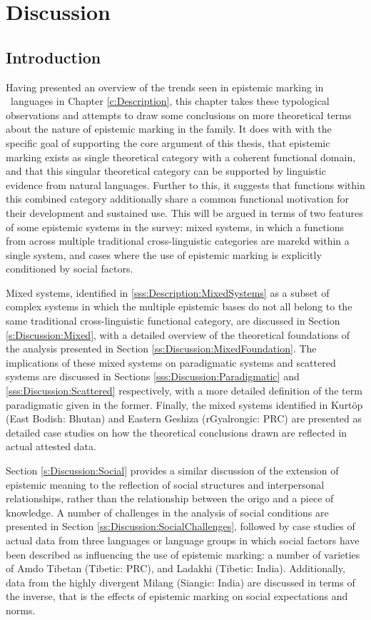 \chapter{Discussion}\label{c:Discussion}
\section{Introduction}\label{s:Discussion:Introduction}
Having presented an overview of the trends seen in epistemic marking in \lfam\ languages in Chapter \ref{c:Description}, this chapter takes these typological observations and attempts to draw some conclusions on more theoretical terms about the nature of epistemic marking in the family. It does with with the specific goal of supporting the core argument of this thesis, that epistemic marking exists as single theoretical category with a coherent functional domain, and that this singular theoretical category can be supported by linguistic evidence from natural languages. Further to this, it suggests that functions within this combined category additionally share a common functional motivation for their development and sustained use. This will be argued in terms of two features of some epistemic systems in the survey: mixed systems, in which a functions from across multiple traditional cross-linguistic categories are marekd within a single system, and cases where the use of epistemic marking is explicitly conditioned by social factors.

Mixed systems, identified in \ref{sss:Description:MixedSystems} as a subset of complex systems in which the multiple epistemic bases do not all belong to the same traditional cross-linguistic functional category, are discussed in Section \ref{s:Discussion:Mixed}, with a detailed overview of the theoretical foundations of the analysis presented in Section \ref{ss:Discussion:MixedFoundation}. The implications of these mixed systems on paradigmatic systems and scattered systems are discussed in Sections \ref{sss:Discussion:Paradigmatic} and \ref{sss:Discussion:Scattered} respectively, with a more detailed definition of the term paradigmatic given in the former. Finally, the mixed systems identified in Kurtöp (East Bodish: Bhutan) and Eastern Geshiza (rGyalrongic: PRC) are presented as detailed case studies on how the theoretical conclusions drawn are reflected in actual attested data.

Section \ref{s:Discussion:Social} provides a similar discussion of the extension of epistemic meaning to the reflection of social structures and interpersonal relationships, rather than the relationship between the origo and a piece of knowledge. A number of challenges in the analysis of social conditions are presented in Section \ref{ss:Discussion:SocialChallenges}, followed by case studies of actual data from three languages or language groups in which social factors have been described as influencing the use of epistemic marking: a number of varieties of Amdo Tibetan (Tibetic: PRC), and Ladakhi (Tibetic: India). Additionally, data from the highly divergent Milang (Siangic: India) are discussed in terms of the inverse, that is the effects of epistemic marking on social expectations and norms.

